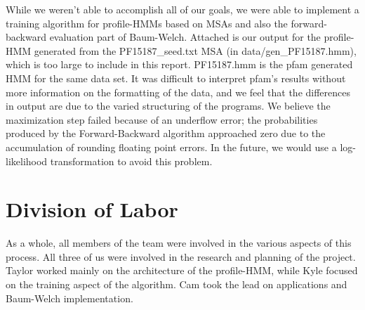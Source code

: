 \documentclass{article}
\begin{document}
While we weren't able to accomplish all of our goals, we were able to implement a training algorithm for profile-HMMs based on MSAs and also the forward-backward evaluation part of Baum-Welch. Attached is our output for the profile-HMM generated from the PF15187\_seed.txt MSA (in data/gen\_PF15187.hmm), which is too large to include in this report. PF15187.hmm is the pfam generated HMM for the same data set. It was difficult to interpret pfam's results without more information on the formatting of the data, and we feel that the differences in output are due to the varied structuring of the programs. We believe the maximization step failed because of an underflow error; the probabilities produced by the Forward-Backward algorithm approached zero due to the accumulation of rounding floating point errors. In the future, we would use a log-likelihood transformation to avoid this problem.


\section{Division of Labor}
As a whole, all members of the team were involved in the various aspects of this process. All three of us were involved in the research and planning of the project. Taylor worked mainly on the architecture of the profile-HMM, while Kyle focused on the training aspect of the algorithm. Cam took the lead on applications and Baum-Welch implementation. 
\end{document}
